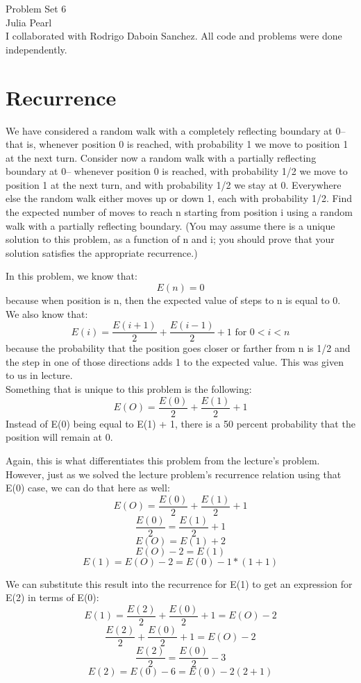 \documentclass[11pt, solution, letterpaper]{format}
\begin{document}
Problem Set 6\\
Julia Pearl\\

I collaborated with Rodrigo Daboin Sanchez. All code and problems were done independently.
\clearpage
\section{Recurrence}
We have considered a random walk with a completely reflecting boundary at 0– that is, whenever position 0
is reached, with probability 1 we move to position 1 at the next turn. Consider now a random walk with a
partially reflecting boundary at 0– whenever position 0 is reached, with probability 1/2 we move to position 1
at the next turn, and with probability 1/2 we stay at 0. Everywhere else the random walk either moves up or
down 1, each with probability 1/2.
Find the expected number of moves to reach n starting from position i using a random walk with a partially
reflecting boundary. (You may assume there is a unique solution to this problem, as a function of n and i; you
should prove that your solution satisfies the appropriate recurrence.)

In this problem, we know that:\\
$$E(n) = 0 $$ because when position is n, then the expected value of steps to n is equal to 0.\\
We also know that:
$$E(i) = \frac{E(i + 1)}{2} + \frac{E(i - 1)}{2} + 1 \text{ for } 0 < i < n$$
because the probability that the position goes closer or farther from n is 1/2 and the step in one of those directions adds 1 to the expected value. This was given to us in lecture.\\
Something that is unique to this problem is the following:
$$E(O) = \frac{E(0)}{2} + \frac{E(1)}{2} + 1 $$
Instead of E(0) being equal to E(1) + 1, there is a 50 percent probability that the position will remain at 0.

Again, this is what differentiates this problem from the lecture's problem. However, just as we solved the lecture problem's recurrence relation using that E(0) case, we can do that here as well:
$$E(O) = \frac{E(0)}{2} + \frac{E(1)}{2} + 1 $$
$$\frac{E(0)}{2} = \frac{E(1)}{2} + 1 $$
$$E(O) = E(1) + 2 $$
$$E(O) - 2 = E(1) $$
$$E(1) = E(O) - 2 = E(0) - 1*(1 + 1)$$

We can substitute this result into the recurrence for E(1) to get an expression for E(2) in terms of E(0):
$$E(1) = \frac{E(2)}{2} + \frac{E(0)}{2} + 1 = E(O) - 2$$
$$\frac{E(2)}{2} + \frac{E(0)}{2} + 1 = E(O) - 2$$
$$\frac{E(2)}{2} = \frac{E(0)}{2} - 3$$
$$E(2) = E(0) - 6 = E(0) - 2(2 + 1)$$
\end{document}
